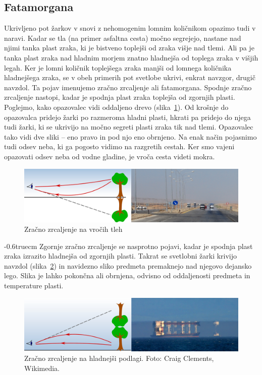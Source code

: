 \subsection*{Fatamorgana}
Ukrivljeno pot žarkov v snovi z nehomogenim lomnim količnikom opazimo
tudi v naravi. Kadar se tla (na primer asfaltna cesta) 
močno segrejejo, nastane nad njimi tanka plast zraka, ki je bistveno 
toplejši od zraka višje nad tlemi. Ali pa je tanka plast zraka nad 
hladnim morjem znatno hladnejša od toplega zraka v višjih legah. Ker je 
lomni količnik toplejšega zraka manjši od lomnega količnika hladnejšega zraka, 
se v obeh primerih pot svetlobe ukrivi, enkrat navzgor, drugič navzdol. Ta pojav
imenujemo zračno zrcaljenje ali fatamorgana.
Spodnje zračno zrcaljenje nastopi, kadar je spodnja plast zraka toplejša 
od zgornjih plasti. Poglejmo, kako opazovalec vidi oddaljeno drevo 
(slika~\ref{fig:02_Fata1}). Od krošnje do opazovalca pridejo žarki
po razmeroma hladni plasti, hkrati pa pridejo do njega tudi žarki, ki 
se ukrivijo na močno segreti plasti zraka tik nad tlemi. Opazovalec
tako vidi dve sliki -- eno pravo in pod njo eno obrnjeno. Na enak način 
pojasnimo tudi odsev neba, ki ga pogosto vidimo na razgretih cestah.
Ker smo vajeni opazovati
odsev neba od vodne gladine, je vroča cesta videti mokra.
\begin{figure}[h!]
\centering
\includegraphics[width=12truecm]{slike/02_Fata1.jpg}
\caption{Zračno zrcaljenje na vročih tleh}
\label{fig:02_Fata1}
\end{figure}
\vglue-0.6truecm
Zgornje zračno zrcaljenje se nasprotno pojavi, 
kadar je spodnja plast zraka izrazito hladnejša od zgornjih plasti. 
Takrat se svetlobni žarki krivijo navzdol (slika~\ref{fig:02_Fata2})
in navidezno sliko predmeta premaknejo nad njegovo dejansko lego. 
Slika je lahko pokončna ali obrnjena, odvisno od oddaljenosti predmeta
in temperature plasti. 
\begin{figure}[h!]
\centering
\includegraphics[width=12truecm]{slike/02_Fata2.jpg}
\caption{Zračno zrcaljenje na hladnejši podlagi. Foto: Craig Clements, Wikimedia.}
\label{fig:02_Fata2}
\end{figure}
